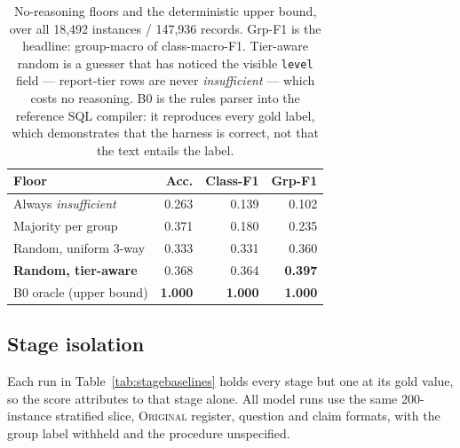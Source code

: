 \begin{table}[t]
\centering
\small
\begin{tabular}{lrrr}
\toprule
Floor & Acc. & Class-F1 & \textbf{Grp-F1} \\
\midrule
Always \emph{insufficient} & 0.263 & 0.139 & 0.102 \\
Majority per group & 0.371 & 0.180 & 0.235 \\
Random, uniform 3-way & 0.333 & 0.331 & 0.360 \\
\textbf{Random, tier-aware} & 0.368 & 0.364 & \textbf{0.397} \\
\midrule
B0 oracle (upper bound) & \textbf{1.000} & \textbf{1.000} & \textbf{1.000} \\
\bottomrule
\end{tabular}
\caption{No-reasoning floors and the deterministic upper bound, over all 18{,}492
instances / 147{,}936 records. Grp-F1 is the headline: group-macro of
class-macro-F1. Tier-aware random is a guesser that has noticed the visible
\texttt{level} field --- report-tier rows are never \emph{insufficient} --- which
costs no reasoning. B0 is the rules parser into the reference SQL compiler: it
reproduces every gold label, which demonstrates that the harness is correct, not
that the text entails the label.}
\label{tab:floors}
\end{table}

\subsection{Stage isolation}

Each run in Table~\ref{tab:stagebaselines} holds every stage but one at its gold
value, so the score attributes to that stage alone. All model runs use the same
200-instance stratified slice, \textsc{Original} register, question and claim
formats, with the group label withheld and the procedure unspecified.

